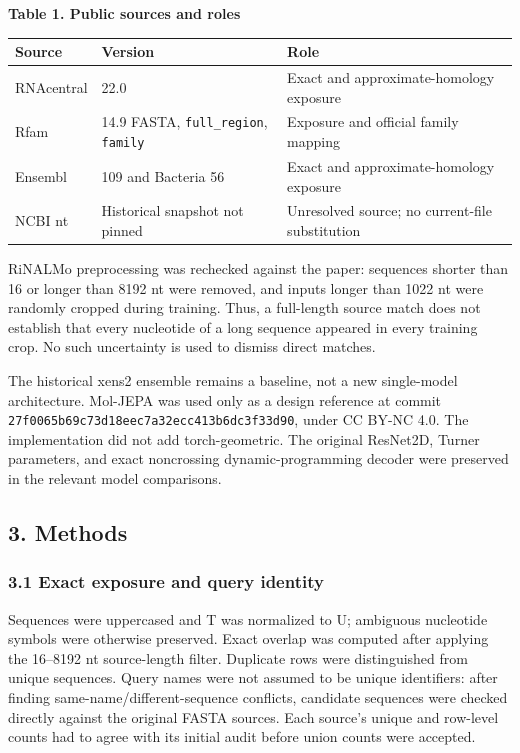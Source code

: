 \documentclass[
  11pt]{article}
\begin{document}
\textbf{Table 1. Public sources and roles}

\begin{longtable}[]{@{}lll@{}}
\toprule
Source & Version & Role \\
\midrule
\endhead
RNAcentral & 22.0 & Exact and approximate-homology exposure \\
Rfam & 14.9 FASTA, \texttt{full\_region}, \texttt{family} & Exposure and
official family mapping \\
Ensembl & 109 and Bacteria 56 & Exact and approximate-homology
exposure \\
NCBI nt & Historical snapshot not pinned & Unresolved source; no
current-file substitution \\
\bottomrule
\end{longtable}

RiNALMo preprocessing was rechecked against the paper: sequences shorter
than 16 or longer than 8192 nt were removed, and inputs longer than 1022
nt were randomly cropped during training. Thus, a full-length source
match does not establish that every nucleotide of a long sequence
appeared in every training crop. No such uncertainty is used to dismiss
direct matches.

The historical xens2 ensemble remains a baseline, not a new single-model
architecture. Mol-JEPA was used only as a design reference at commit
\texttt{27f0065b69c73d18eec7a32ecc413b6dc3f33d90}, under CC BY-NC 4.0.
The implementation did not add torch-geometric. The original ResNet2D,
Turner parameters, and exact noncrossing dynamic-programming decoder
were preserved in the relevant model comparisons.

\hypertarget{3-methods}{%
\subsection{3. Methods}\label{3-methods}}

\hypertarget{31-exact-exposure-and-query-identity}{%
\subsubsection{3.1 Exact exposure and query
identity}\label{31-exact-exposure-and-query-identity}}

Sequences were uppercased and T was normalized to U; ambiguous
nucleotide symbols were otherwise preserved. Exact overlap was computed
after applying the 16--8192 nt source-length filter. Duplicate rows were
distinguished from unique sequences. Query names were not assumed to be
unique identifiers: after finding same-name/different-sequence
conflicts, candidate sequences were checked directly against the
original FASTA sources. Each source's unique and row-level counts had to
agree with its initial audit before union counts were accepted.
\end{document}
